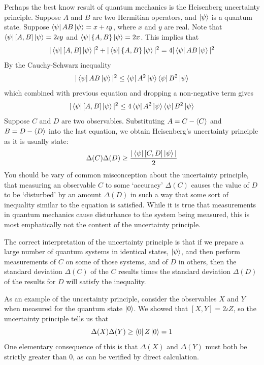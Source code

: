\begin{importantnote}
    Perhaps the best know result of quantum mechanics is the Heisenberg uncertainty principle. Suppose $A$ and $B$ are two Hermitian operators, and $\ket{\psi}$ is a quantum state. Suppose $\bra{\psi}AB\ket{\psi}=x+\iota y$, where $x$ and $y$ are real. Note that $\bra{\psi}[A,B]\ket{\psi}=2\iota y$ and $\bra{\psi}\{A,B\}\ket{\psi}=2x$. This implies that
    \[
    |\bra{\psi}[A,B]\ket{\psi}|^2 +|\bra{\psi}\{A,B\}\ket{\psi}|^2=4|\bra{\psi}AB\ket{\psi}|^2
    \]
    By the Cauchy-Schwarz inequality
    \[
    |\bra{\psi}AB\ket{\psi}|^2 \leq \bra{\psi}A^2\ket{\psi}\bra{\psi}B^2\ket{\psi}
    \]
    which combined with previous equation and dropping a non-negative term gives
    \[
    |\bra{\psi}[A,B]\ket{\psi}|^2 \leq 4\bra{\psi}A^2\ket{\psi}\bra{\psi}B^2\ket{\psi}
    \]
    Suppose $C$ and $D$ are two observables. Substituting $A=C-\braket{C}$ and $B=D-\braket{D}$ into the last equation, we obtain Heisenberg's uncertainty principle as it is usually state:
    \[
    \Delta(C)\Delta (D)\geq \frac{|\bra{\psi}[C,D]\ket{\psi}|}{2}
    \]
    You should be vary of common misconception about the uncertainty principle, that measuring an observable $C$ to some `accuracy' $\Delta(C)$ causes the value of $D$ to be `disturbed' by an amount $\Delta (D)$ in such a way that some sort of inequality similar to the equation is satisfied. While it is true that measurements in quantum mechanics cause disturbance to the system being measured, this is most emphatically not the content of the uncertainty principle.

    The correct interpretation of the uncertainty principle is that if we prepare a large number of quantum systems in identical states, $\ket{\psi}$, and then perform measurements of $C$ on some of those systems, and of $D$ in others, then the standard deviation $\Delta(C)$ of the $C$ results times the standard deviation $\Delta (D)$ of the results for $D$ will satisfy the inequality.

    As an example of the uncertainty principle, consider the observables $X$ and $Y$ when measured for the quantum state $\ket{0}$. We showed that $[X,Y]=2\iota Z$, so the uncertainty principle tells us that
    \[
    \Delta(X)\Delta(Y)\geq \bra{0}Z\ket{0}=1
    \]
    One elementary consequence of this is that $\Delta(X)$ and $\Delta(Y)$ must both be strictly greater than $0$, as can be verified by direct calculation.

\end{importantnote}
